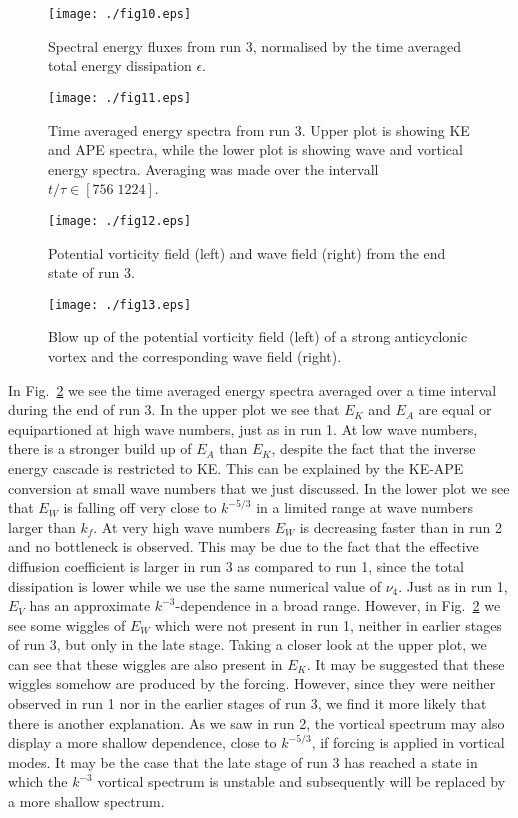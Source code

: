 \begin{figure}[h]
\centerline{\texttt{[image: ./fig10.eps]}}
 \caption{Spectral energy fluxes from run 3, normalised by the time averaged total energy dissipation $ \epsilon $. }
 \label{F2}
 \end{figure}



 \begin{figure}[h]
\centerline{\texttt{[image: ./fig11.eps]}}
 \caption{ Time averaged energy spectra from run 3. Upper plot is showing KE and APE spectra, while the lower plot is showing wave and vortical energy spectra. Averaging was made over the intervall $ t/\tau \in [756 \; 1224] $.}
 \label{S2}
 \end{figure}

 \begin{figure}[h]
 \centerline{\texttt{[image: ./fig12.eps]}}
\caption{Potential vorticity field (left) and wave field (right) from the end state of run 3.}
 \label{Vis2}
 \end{figure}

\begin{figure}[h]
\centerline{\texttt{[image: ./fig13.eps]}}
\caption{Blow up of the potential vorticity field (left) of a strong anticyclonic vortex and the corresponding wave field (right). }
\label{Vis3}
\end{figure}




In Fig.~\ref{S2} we see the time averaged energy spectra averaged over a time
interval during the end of run 3.  In the upper plot we see that $ E_K $ and $ E_A $ {
are equal or equipartioned} at high wave numbers, just as in run 1. At low wave
numbers, there is a stronger build up of $ E_A $ than $ E_K $, despite the fact that
the inverse energy cascade is restricted to KE. This can be explained by the KE-APE
conversion at small wave numbers that we just discussed.  In the lower plot we see that
$ E_W $ is falling off very close to $ k^{-5/3} $ in a limited range at wave numbers
larger than $ k_f $. At very high wave numbers  $ E_W $  is decreasing faster than in
run 2 and no bottleneck is observed. This may be due to the fact that the effective
diffusion coefficient is larger in run 3 as compared to run 1, since the total
dissipation is lower while we use the same numerical value of $ \nu_4 $.  Just as in
run 1, $ E_{V} $ has an approximate $ k^{-3} $-dependence in a broad range. However,
in Fig.~\ref{S2} we see some wiggles of $ E_W $ which were not present in run 1,
neither  in earlier stages of run 3, but only in the late stage. Taking a closer look
at the upper plot, we can see that these wiggles are also present in $ E_K $. It may be
suggested that these wiggles somehow are produced by the forcing. However, since they
were neither observed in run 1 nor in the earlier stages of run 3, we find it more
likely that there is another explanation. { As we saw in run 2, the vortical spectrum
may also display a more shallow dependence, close to $ k^{-5/3} $, if forcing is
applied in vortical modes. It may be the case that the late stage of run 3 has reached
a state in which the $ k^{-3} $ vortical spectrum is unstable and subsequently will be
replaced by a more shallow spectrum. }

